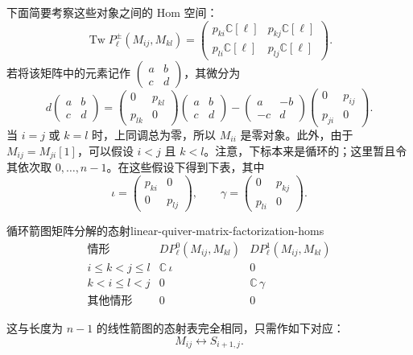 下面简要考察这些对象之间的 Hom 空间：
\[
  \operatorname{Tw}P^\pm_\ell(M_{ij},M_{kl})=
  \begin{pmatrix}
    p_{ki}\mathbb C[\ell]&p_{kj}\mathbb C[\ell]\\
    p_{li}\mathbb C[\ell]&p_{lj}\mathbb C[\ell]
  \end{pmatrix}.
\]
若将该矩阵中的元素记作 $\begin{pmatrix}a&b\\c&d\end{pmatrix}$，其微分为
\[
  d\begin{pmatrix}a&b\\c&d\end{pmatrix}
  =\begin{pmatrix}0&p_{kl}\\p_{lk}&0\end{pmatrix}
   \begin{pmatrix}a&b\\c&d\end{pmatrix}
  -\begin{pmatrix}a&-b\\-c&d\end{pmatrix}
   \begin{pmatrix}0&p_{ij}\\p_{ji}&0\end{pmatrix}.
\]
当 $i=j$ 或 $k=l$ 时，上同调总为零，所以 $M_{ii}$ 是零对象。此外，由于 $M_{ij}=M_{ji}[1]$，可以假设 $i<j$ 且 $k<l$。注意，下标本来是循环的；这里暂且令其依次取 $0,\ldots,n-1$。在这些假设下得到下表，其中
\[
  \iota=\begin{pmatrix}p_{ki}&0\\0&p_{lj}\end{pmatrix},
  \qquad
  \gamma=\begin{pmatrix}0&p_{kj}\\p_{li}&0\end{pmatrix}.
\]

\begin{lemma}{循环箭图矩阵分解的态射}{linear-quiver-matrix-factorization-homs}
\[
\begin{array}{c|c|c}
\text{情形}&DP^0_\ell(M_{ij},M_{kl})&DP^1_\ell(M_{ij},M_{kl})\\\hline
i\leq k<j\leq l&\mathbb C\,\iota&0\\
k<i\leq l<j&0&\mathbb C\,\gamma\\
\text{其他情形}&0&0
\end{array}
\]
\end{lemma}

这与长度为 $n-1$ 的线性箭图的态射表完全相同，只需作如下对应：
\[
  M_{ij}\longleftrightarrow S_{i+1,j}.
\]

